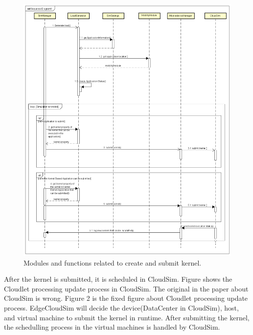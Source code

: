 \begin{figure}
	\centering
	\includegraphics[width=1\textwidth]{./UML/sequence-diagram-create-kernel.png}
	\caption{\label{fig:create-kernel}Modules and functions related to create and submit kernel.}
\end{figure}

After the kernel is submitted, it is scheduled in CloudSim. Figure  shows the Cloudlet processing update process in CloudSim. The original in the paper about CloudSim is wrong. Figure 2 is the fixed figure about Cloudlet processing update process. EdgeCloudSim will decide the device(DataCenter in CloudSim), host, and virtual machine to submit the kernel in runtime. After submitting the kernel, the schedulling process in the virtual machines is handled by CloudSim.


